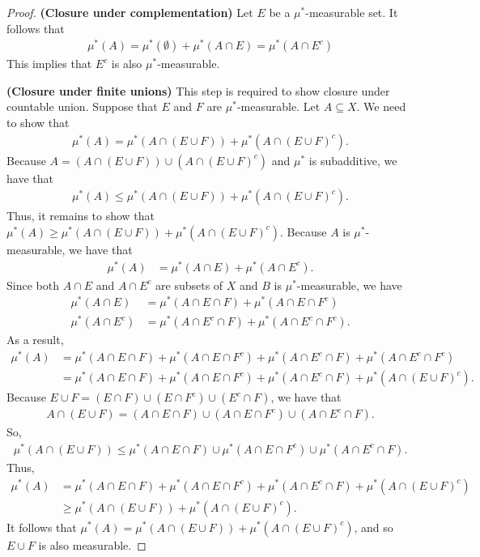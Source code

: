 \documentclass[10pt]{article}
\begin{document}
\begin{itemize}
\begin{proof}
    {\bf (Closure under complementation)} Let $E$ be a $\mu^*$-measurable set. It follows that
    \begin{align*}
      \mu^*(A) = \mu^*(\emptyset) + \mu^*(A \cap E) = \mu^*(A \cap E^c)
    \end{align*}
    This implies that $E^c$ is also $\mu^*$-measurable.

    {\bf (Closure under finite unions)} This step is required to show closure under countable union. Suppose that $E$ and $F$ are $\mu^*$-measurable. Let $A \subseteq X$. We need to show that
    \begin{align*}
      \mu^*(A) = \mu^*(A \cap (E \cup F)) + \mu^*(A \cap (E \cup F)^c).
    \end{align*}
    Because $A = (A \cap (E \cup F)) \cup (A \cap (E \cup F)^c)$ and $\mu^*$ is subadditive, we have that
    \begin{align*}
      \mu^*(A) \leq \mu^*(A \cap (E \cup F)) + \mu^*(A \cap (E \cup F)^c).
    \end{align*}
    Thus, it remains to show that $\mu^*(A) \geq \mu^*(A \cap (E \cup F)) + \mu^*(A \cap (E \cup F)^c)$. Because $A$ is $\mu^*$-measurable, we have that
    \begin{align*}
      \mu^*(A) &= \mu^*(A \cap E) + \mu^*(A \cap E^c).
    \end{align*}
    Since both $A \cap E$ and $A \cap E^c$ are subsets of $X$ and $B$ is $\mu^*$-measurable, we have
    \begin{align*}
      \mu^*(A \cap E) &= \mu^*(A \cap E \cap F) + \mu^*(A \cap E \cap F^c) \\
      \mu^*(A \cap E^c) &= \mu^*(A \cap E^c \cap F) + \mu^*(A \cap E^c \cap F^c).
    \end{align*}
    As a result,
    \begin{align*}
      \mu^*(A) &= \mu^*(A \cap E \cap F) + \mu^*(A \cap E \cap F^c) + \mu^*(A \cap E^c \cap F) + \mu^*(A \cap E^c \cap F^c) \\
      &= \mu^*(A \cap E \cap F) + \mu^*(A \cap E \cap F^c) + \mu^*(A \cap E^c \cap F) + \mu^*(A \cap (E \cup F)^c).
    \end{align*}
    Because $E \cup F = (E \cap F) \cup (E \cap F^c) \cup (E^c \cap F)$, we have that
    \begin{align*}
      A \cap (E \cup F) = (A \cap E \cap F) \cup (A \cap E \cap F^c) \cup (A \cap E^c \cap F).
    \end{align*}
    So,
    \begin{align*}
      \mu^*(A \cap (E \cup F)) \leq \mu^*(A \cap E \cap F) \cup \mu^*(A \cap E \cap F^c) \cup \mu^*(A \cap E^c \cap F).
    \end{align*}
    Thus,
    \begin{align*}
      \mu^*(A) 
      &= \mu^*(A \cap E \cap F) + \mu^*(A \cap E \cap F^c) + \mu^*(A \cap E^c \cap F) + \mu^*(A \cap (E \cup F)^c)\\
      &\geq \mu^*(A \cap (E \cup F)) + \mu^*(A \cap (E \cup F)^c).
    \end{align*}
    It follows that $\mu^*(A) = \mu^*(A \cap (E \cup F)) + \mu^*(A \cap (E \cup F)^c)$, and so $E \cup F$ is also measurable.


\end{proof}
\end{itemize}
\end{document}
